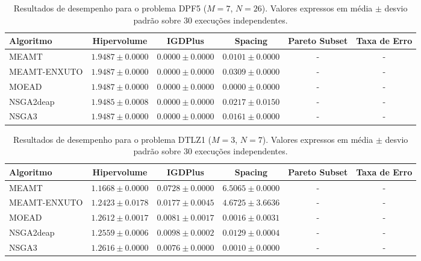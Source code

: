 \begin{table}[htpb]
\centering
\caption{Resultados de desempenho para o problema DPF5 ($M=7$, $N=26$). Valores expressos em média $\pm$ desvio padrão sobre 30 execuções independentes.}
\label{tab:DPF5_M7_N26}
\begin{tabular}{lccccc}
\hline\hline
Algoritmo & Hipervolume & IGDPlus & Spacing & Pareto Subset & Taxa de Erro \\
\hline
MEAMT & $1.9487 \pm 0.0000$ & $0.0000 \pm 0.0000$ & $0.0101 \pm 0.0000$ & - & - \\
MEAMT-ENXUTO & $1.9487 \pm 0.0000$ & $0.0000 \pm 0.0000$ & $0.0309 \pm 0.0000$ & - & - \\
MOEAD & $1.9487 \pm 0.0000$ & $0.0000 \pm 0.0000$ & $0.0000 \pm 0.0000$ & - & - \\
NSGA2deap & $1.9485 \pm 0.0008$ & $0.0000 \pm 0.0000$ & $0.0217 \pm 0.0150$ & - & - \\
NSGA3 & $1.9487 \pm 0.0000$ & $0.0000 \pm 0.0000$ & $0.0161 \pm 0.0000$ & - & - \\
\hline\hline
\end{tabular}
\end{table}

\begin{table}[htpb]
\centering
\caption{Resultados de desempenho para o problema DTLZ1 ($M=3$, $N=7$). Valores expressos em média $\pm$ desvio padrão sobre 30 execuções independentes.}
\label{tab:DTLZ1_M3_N7}
\begin{tabular}{lccccc}
\hline\hline
Algoritmo & Hipervolume & IGDPlus & Spacing & Pareto Subset & Taxa de Erro \\
\hline
MEAMT & $1.1668 \pm 0.0000$ & $0.0728 \pm 0.0000$ & $6.5065 \pm 0.0000$ & - & - \\
MEAMT-ENXUTO & $1.2423 \pm 0.0178$ & $0.0177 \pm 0.0045$ & $4.6725 \pm 3.6636$ & - & - \\
MOEAD & $1.2612 \pm 0.0017$ & $0.0081 \pm 0.0017$ & $0.0016 \pm 0.0031$ & - & - \\
NSGA2deap & $1.2559 \pm 0.0006$ & $0.0098 \pm 0.0002$ & $0.0129 \pm 0.0004$ & - & - \\
NSGA3 & $1.2616 \pm 0.0000$ & $0.0076 \pm 0.0000$ & $0.0010 \pm 0.0000$ & - & - \\
\hline\hline
\end{tabular}
\end{table}

